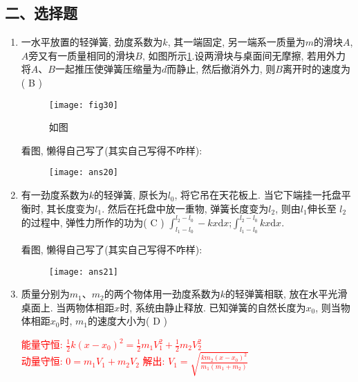 \subsection*{二、选择题}
\begin{enumerate}
    \item 一水平放置的轻弹簧, 劲度系数为$k$, 其一端固定, 另一端系一质量为$m$的滑块$A$, 
    $A$旁又有一质量相同的滑块$B$, 如图所示\ref{Fig:30}.设两滑块与桌面间无摩擦, 若用外力将$A$、$B$一起推压使弹簧压缩量为$d$而静止, 然后撤消外力, 则$B$离开时的速度为( B )
    \begin{figure}[h]
        \centering
        \texttt{[image: fig30]}
            \caption{如图}\label{Fig:30}
    \end{figure}
    \begin{note}
        看图, 懒得自己写了(其实自己写得不咋样):
    \end{note}
    \begin{figure}[H]
        \centering
        \texttt{[image: ans20]}
    \end{figure}
    \item 有一劲度系数为$k$的轻弹簧, 原长为$l_0$, 将它吊在天花板上. 当它下端挂一托盘平衡时, 其长度变为$l_1$. 然后在托盘中放一重物, 弹簧长度变为$l_2$, 则由$l_1$伸长至
    $l_2$的过程中, 弹性力所作的功为( C )
    {$\displaystyle{\int_{l_1-l_0}^{l_2-l_0}-kx\mathrm{d}x}$;}{$\displaystyle{\int_{l_1-l_0}^{l_2-l_0}kx\mathrm{d}x}$.}
    \begin{note}
        看图, 懒得自己写了(其实自己写得不咋样):
    \end{note}
    \begin{figure}[H]
        \centering
        \texttt{[image: ans21]}
    \end{figure}
    \item 质量分别为$m_1$、$m_2$的两个物体用一劲度系数为$k$的轻弹簧相联, 放在水平光滑桌面上. 当两物体相距$x$时, 系统由静止释放. 已知弹簧的自然长度为$x_0$, 则当物体相距$x_0$时, $m_1$的速度大小为( D )
    \begin{note}
        \textcolor{red}{能量守恒: $\frac{1}{2}k(x-x_0)^2=\frac{1}{2}m_1V_1^2+\frac{1}{2}m_2V_2^2$}\\
        \textcolor{red}{动量守恒: $0=m_1V_1+m_2V_2$ 解出: $V_1=\sqrt{\frac{km_2(x-x_0)^2}{m_1(m_1+m_2)}}$}
    \end{note}
\end{enumerate}
